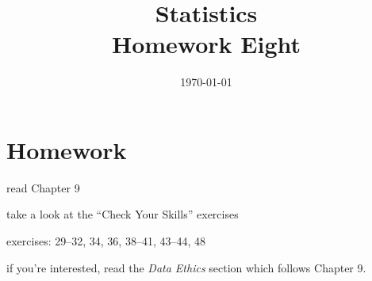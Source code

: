 \documentclass[letterpaper, landscape]{exam}
\title{Statistics \\ Homework Eight}
\date{\today}
\author{}
\begin{document}
  \maketitle

  \ifprintanswers{}
  \else
    \section{Homework}
    \begin{itemize*}
      \item read Chapter 9 
      \item take a look at the ``Check Your Skills'' exercises
      \item exercises: 29--32, 34, 36, 38--41, 43--44, 48
      \item if you're interested, read the {\em Data Ethics\/} section which
        follows Chapter 9.
    \end{itemize*}
  \fi
\end{document}
